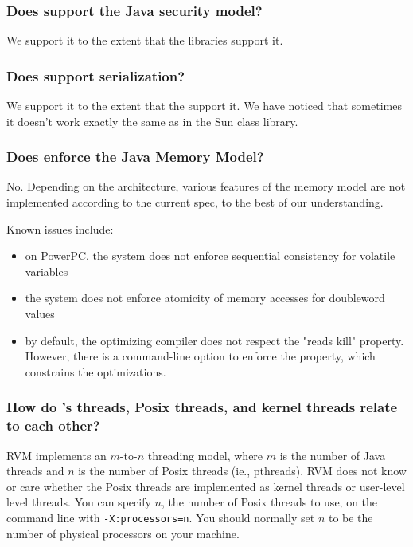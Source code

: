 \subsubsection{Does \jrvm{} support the Java\TMheadingweb{} security model?} 

We support it to the extent that the 
libraries support it.

\subsubsection{Does \jrvm{} support serialization?}

We support it to the extent that the 
support it. We have noticed that sometimes it doesn't
work exactly the same as in the Sun\Rweb{} class library.

\subsubsection{Does \jrvm{} enforce the Java Memory Model?}

No. Depending on the architecture, various features of the memory model
are not implemented according to the current spec, to the best of our
understanding.

Known issues include:
\begin{itemize}
\item on PowerPC\TMweb{}, the system does not enforce
sequential consistency for volatile variables
\item the system does not enforce atomicity of memory accesses for
doubleword values
\item by default, the optimizing compiler does not respect the "reads
kill" property.  However, there is a command-line option to enforce the
property, which constrains the optimizations.
\end{itemize}

\subsubsection{How do \jrvm{}'s threads, Posix threads, and kernel
threads relate to each other?}

RVM implements an $m$-to-$n$ threading model, where $m$ is the number of 
Java threads and $n$ is the number of Posix threads (ie., pthreads).  RVM
does not know or care whether the Posix threads are implemented as kernel
threads or user-level level threads.  You can specify $n$, the number of
Posix threads to use, on the command line with {\tt -X:processors=n}.
You should normally set $n$ to be the number of physical processors on
your machine.  

